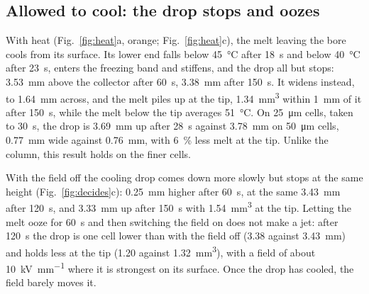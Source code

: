\documentclass[10pt,a4paper]{article}
\begin{document}
\subsection{Allowed to cool: the drop stops and oozes}
With heat (Fig.~\ref{fig:heat}a, orange; Fig.~\ref{fig:heat}c), the melt leaving the bore cools from its
surface. Its lower end falls below \qty{45}{\celsius} after \qty{18}{\second} and below \qty{40}{\celsius}
after \qty{23}{\second}, enters the freezing band and stiffens, and the drop all but stops:
\qty{3.53}{\milli\metre} above the collector after \qty{60}{\second}, \qty{3.38}{\milli\metre} after
\qty{150}{\second}. It widens instead, to \qty{1.64}{\milli\metre} across, and the melt piles up at the tip,
\qty{1.34}{\cubic\milli\metre} within \qty{1}{\milli\metre} of it after \qty{150}{\second}, while the melt
below the tip averages \qty{51}{\celsius}. On \qty{25}{\micro\metre} cells, taken to \qty{30}{\second}, the
drop is \qty{3.69}{\milli\metre} up after \qty{28}{\second} against \qty{3.78}{\milli\metre} on
\qty{50}{\micro\metre} cells, \qty{0.77}{\milli\metre} wide against \qty{0.76}{\milli\metre}, with
\qty{6}{\percent} less melt at the tip. Unlike the column, this result holds on the finer cells.

With the field off the cooling drop comes down more slowly but stops at the same height
(Fig.~\ref{fig:decides}c): \qty{0.25}{\milli\metre} higher after \qty{60}{\second}, at the same
\qty{3.43}{\milli\metre} after \qty{120}{\second}, and \qty{3.33}{\milli\metre} up after \qty{150}{\second}
with \qty{1.54}{\cubic\milli\metre} at the tip. Letting the melt ooze for \qty{60}{\second} and then
switching the field on does not make a jet: after \qty{120}{\second} the drop is one cell lower than with the
field off (3.38 against \qty{3.43}{\milli\metre}) and holds less at the tip (1.20 against
\qty{1.32}{\cubic\milli\metre}), with a field of about \qty{10}{\kilo\volt\per\milli\metre} where it is
strongest on its surface.
Once the drop has cooled, the field barely moves it.
\end{document}
